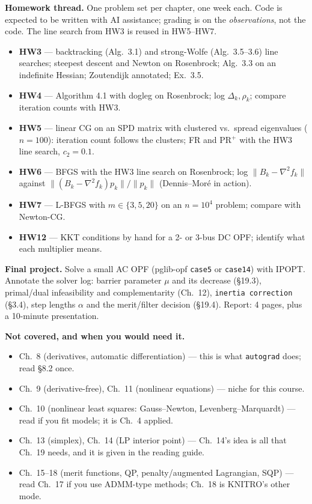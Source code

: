 \documentclass[10pt,a4paper]{article}
\begin{document}
\textbf{Homework thread.} One problem set per chapter, one week each. Code is expected to be written with AI
assistance; grading is on the \emph{observations}, not the code. The line search from HW3 is reused in HW5--HW7.
\begin{itemize}[leftmargin=*,itemsep=0.1em]
  \item \textbf{HW3} --- backtracking (Alg.~3.1) and strong-Wolfe (Alg.~3.5--3.6) line searches; steepest descent
    and Newton on Rosenbrock; Alg.~3.3 on an indefinite Hessian; Zoutendijk annotated; Ex.~3.5.
  \item \textbf{HW4} --- Algorithm 4.1 with dogleg on Rosenbrock; log $\Delta_k,\rho_k$; compare iteration counts
    with HW3.
  \item \textbf{HW5} --- linear CG on an SPD matrix with clustered vs.\ spread eigenvalues ($n=100$): iteration
    count follows the clusters; FR and PR$^{+}$ with the HW3 line search, $c_2=0.1$.
  \item \textbf{HW6} --- BFGS with the HW3 line search on Rosenbrock; log $\|B_k-\nabla^2 f_k\|$ against
    $\|(B_k-\nabla^2 f_k)p_k\|/\|p_k\|$ (Dennis--Mor\'e in action).
  \item \textbf{HW7} --- L-BFGS with $m\in\{3,5,20\}$ on an $n=10^4$ problem; compare with Newton-CG.
  \item \textbf{HW12} --- KKT conditions by hand for a 2- or 3-bus DC OPF; identify what each multiplier means.
\end{itemize}

\textbf{Final project.} Solve a small AC OPF (pglib-opf \texttt{case5} or \texttt{case14}) with IPOPT. Annotate
the solver log: barrier parameter $\mu$ and its decrease (\S19.3), primal/dual infeasibility and complementarity
(Ch.~12), \texttt{inertia correction} (\S3.4), step lengths $\alpha$ and the merit/filter decision (\S19.4).
Report: 4 pages, plus a 10-minute presentation.

\textbf{Not covered, and when you would need it.}
\begin{itemize}[leftmargin=*,itemsep=0.1em]
  \item Ch.~8 (derivatives, automatic differentiation) --- this is what \texttt{autograd} does; read \S8.2 once.
  \item Ch.~9 (derivative-free), Ch.~11 (nonlinear equations) --- niche for this course.
  \item Ch.~10 (nonlinear least squares: Gauss--Newton, Levenberg--Marquardt) --- read if you fit models; it is
    Ch.~4 applied.
  \item Ch.~13 (simplex), Ch.~14 (LP interior point) --- Ch.~14's idea is all that Ch.~19 needs, and it is given
    in the reading guide.
  \item Ch.~15--18 (merit functions, QP, penalty/augmented Lagrangian, SQP) --- read Ch.~17 if you use
    ADMM-type methods; Ch.~18 is KNITRO's other mode.
\end{itemize}
\end{document}
